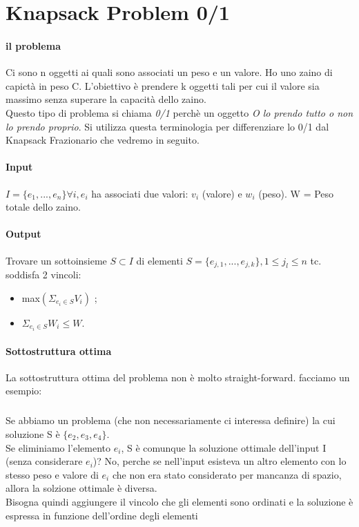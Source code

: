 \documentclass[12pt, a4paper, openany]{book}
\begin{document}
\section{Knapsack Problem 0/1}
\paragraph{il problema} Ci sono n oggetti ai quali sono associati un peso e un valore. Ho uno zaino di capictà in peso C. L'obiettivo è prendere k oggetti tali per cui il valore sia massimo senza superare la capacità dello zaino.\\
Questo tipo di problema si chiama \emph{0/1} perchè un oggetto \emph{O lo prendo tutto o non lo prendo proprio}. Si utilizza questa terminologia per differenziare lo 0/1 dal Knapsack Frazionario che vedremo in seguito.
\paragraph{Input} $I = \{e_1,...,e_n\} \forall  i, e_i$ ha associati due valori: $v_i$ (valore) e $w_i$ (peso). W = Peso totale dello zaino.
\paragraph{Output} Trovare un sottoinsieme $ S \subset I $ di elementi $S = \{e_{j,1}, ..., e_{j,k}\} , 1 \leq j_l \leq n$ tc. soddisfa 2 vincoli:
\begin{itemize}
	\item max$(\Sigma_{e_i \in S}V_i)$ ;
	\item $\Sigma_{e_i \in S} W_i \leq W$.
\end{itemize} 

\paragraph{Sottostruttura ottima}
La sottostruttura ottima del problema non è molto straight-forward. facciamo un esempio:
\subparagraph*{}Se abbiamo un problema (che non necessariamente ci interessa definire) la cui soluzione S è $\{e_2,e_3,e_4\}$.\\
Se eliminiamo l'elemento $e_i$, S è comunque la soluzione ottimale dell'input I (senza considerare $e_i$)? No, perche se nell'input esisteva un altro elemento con lo stesso peso e valore di $e_i$ che non era stato considerato per mancanza di spazio, allora la solzione ottimale è diversa.
\\Bisogna quindi aggiungere il vincolo che gli elementi sono ordinati e la soluzione è espressa in funzione dell'ordine degli elementi 
\end{document}

